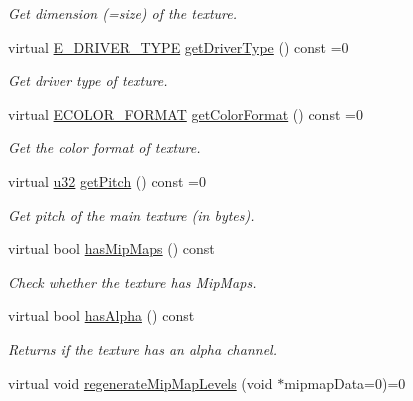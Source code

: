 \begin{DoxyCompactItemize}
\begin{DoxyCompactList}\small\item\em Get dimension (=size) of the texture. \end{DoxyCompactList}\item 
virtual \hyperlink{namespaceirr_1_1video_ae35a6de6d436c76107ad157fe42356d0}{E\+\_\+\+D\+R\+I\+V\+E\+R\+\_\+\+T\+Y\+PE} \hyperlink{classirr_1_1video_1_1ITexture_a4c6abdc0c789e6022e4e1b8a06cfab71}{get\+Driver\+Type} () const =0
\begin{DoxyCompactList}\small\item\em Get driver type of texture. \end{DoxyCompactList}\item 
virtual \hyperlink{namespaceirr_1_1video_a1d5e487888c32b1674a8f75116d829ed}{E\+C\+O\+L\+O\+R\+\_\+\+F\+O\+R\+M\+AT} \hyperlink{classirr_1_1video_1_1ITexture_a48bbc0208c046724fc3264406f774132}{get\+Color\+Format} () const =0
\begin{DoxyCompactList}\small\item\em Get the color format of texture. \end{DoxyCompactList}\item 
virtual \hyperlink{namespaceirr_a0416a53257075833e7002efd0a18e804}{u32} \hyperlink{classirr_1_1video_1_1ITexture_a14fd1eba217a0dd86b40c4d792ab14ea}{get\+Pitch} () const =0
\begin{DoxyCompactList}\small\item\em Get pitch of the main texture (in bytes). \end{DoxyCompactList}\item 
virtual bool \hyperlink{classirr_1_1video_1_1ITexture_a9da815ed3b2a3efec45f957c6918fbba}{has\+Mip\+Maps} () const
\begin{DoxyCompactList}\small\item\em Check whether the texture has Mip\+Maps. \end{DoxyCompactList}\item 
\mbox{\label{classirr_1_1video_1_1ITexture_a5ccc3cc2463f2ac78902eccba63271d3}} 
virtual bool \hyperlink{classirr_1_1video_1_1ITexture_a5ccc3cc2463f2ac78902eccba63271d3}{has\+Alpha} () const
\begin{DoxyCompactList}\small\item\em Returns if the texture has an alpha channel. \end{DoxyCompactList}\item 
virtual void \hyperlink{classirr_1_1video_1_1ITexture_a9517c37f071479d0698cdf597f8fea45}{regenerate\+Mip\+Map\+Levels} (void $\ast$mipmap\+Data=0)=0

\end{DoxyCompactItemize}
